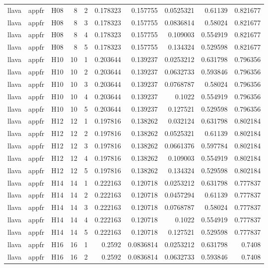 \begin{longtable}{lllrrrrrrr}
llava & appfr & H08 & 8 & 2 & 0.178323 & 0.157755 & 0.0525321 & 0.61139 & 0.821677 \\
llava & appfr & H08 & 8 & 3 & 0.178323 & 0.157755 & 0.0836814 & 0.58024 & 0.821677 \\
llava & appfr & H08 & 8 & 4 & 0.178323 & 0.157755 & 0.109003 & 0.554919 & 0.821677 \\
llava & appfr & H08 & 8 & 5 & 0.178323 & 0.157755 & 0.134324 & 0.529598 & 0.821677 \\
llava & appfr & H10 & 10 & 1 & 0.203644 & 0.139237 & 0.0253212 & 0.631798 & 0.796356 \\
llava & appfr & H10 & 10 & 2 & 0.203644 & 0.139237 & 0.0632733 & 0.593846 & 0.796356 \\
llava & appfr & H10 & 10 & 3 & 0.203644 & 0.139237 & 0.0768787 & 0.58024 & 0.796356 \\
llava & appfr & H10 & 10 & 4 & 0.203644 & 0.139237 & 0.1022 & 0.554919 & 0.796356 \\
llava & appfr & H10 & 10 & 5 & 0.203644 & 0.139237 & 0.127521 & 0.529598 & 0.796356 \\
llava & appfr & H12 & 12 & 1 & 0.197816 & 0.138262 & 0.032124 & 0.631798 & 0.802184 \\
llava & appfr & H12 & 12 & 2 & 0.197816 & 0.138262 & 0.0525321 & 0.61139 & 0.802184 \\
llava & appfr & H12 & 12 & 3 & 0.197816 & 0.138262 & 0.0661376 & 0.597784 & 0.802184 \\
llava & appfr & H12 & 12 & 4 & 0.197816 & 0.138262 & 0.109003 & 0.554919 & 0.802184 \\
llava & appfr & H12 & 12 & 5 & 0.197816 & 0.138262 & 0.134324 & 0.529598 & 0.802184 \\
llava & appfr & H14 & 14 & 1 & 0.222163 & 0.120718 & 0.0253212 & 0.631798 & 0.777837 \\
llava & appfr & H14 & 14 & 2 & 0.222163 & 0.120718 & 0.0457294 & 0.61139 & 0.777837 \\
llava & appfr & H14 & 14 & 3 & 0.222163 & 0.120718 & 0.0768787 & 0.58024 & 0.777837 \\
llava & appfr & H14 & 14 & 4 & 0.222163 & 0.120718 & 0.1022 & 0.554919 & 0.777837 \\
llava & appfr & H14 & 14 & 5 & 0.222163 & 0.120718 & 0.127521 & 0.529598 & 0.777837 \\
llava & appfr & H16 & 16 & 1 & 0.2592 & 0.0836814 & 0.0253212 & 0.631798 & 0.7408 \\
llava & appfr & H16 & 16 & 2 & 0.2592 & 0.0836814 & 0.0632733 & 0.593846 & 0.7408 \\

\end{longtable}
